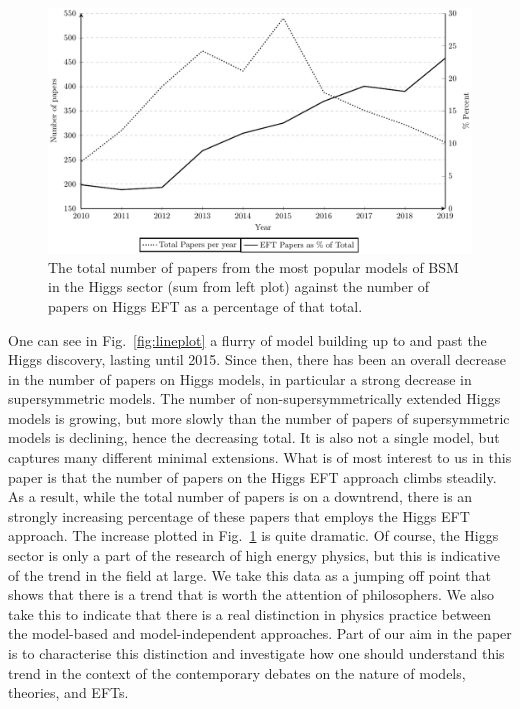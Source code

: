 \begin{figure}
\includegraphics[width=\textwidth]{percenttotal_eft_2107}
\caption{The total number of papers from the most popular models of BSM in the Higgs sector (sum from left plot) against the number of papers on Higgs EFT as a percentage of that total.}
\label{fig:percent}
\end{figure}


One can see in Fig.~\ref{fig:lineplot} a flurry of model building up to and past the Higgs discovery, lasting until 2015. 
Since then, there has been an overall decrease in the number of papers on Higgs models, in particular a strong decrease in supersymmetric models. 
The number of non-supersymmetrically extended Higgs models is growing, but more slowly than the number of papers of supersymmetric models is declining, hence the decreasing total. 
It is also not a single model, but captures many different minimal extensions.
What is of most interest to us in this paper is that the number of papers on the Higgs EFT approach climbs steadily. 
As a result, while the total number of papers is on a downtrend, there is an strongly increasing percentage of these papers that employs the Higgs EFT approach. 
The increase plotted in Fig.~\ref{fig:percent} is quite dramatic.
Of course, the Higgs sector is only a part of the research of high energy physics, but this is indicative of the trend in the field at large. 
We take this data as a jumping off point that shows that there is a trend that is worth the attention of philosophers.
We also take this to indicate that there is a real distinction in physics practice between the model-based and model-independent approaches.  
Part of our aim in the paper is to characterise this distinction and investigate how one should understand this trend in the context of the contemporary debates on the nature of models, theories, and EFTs.
